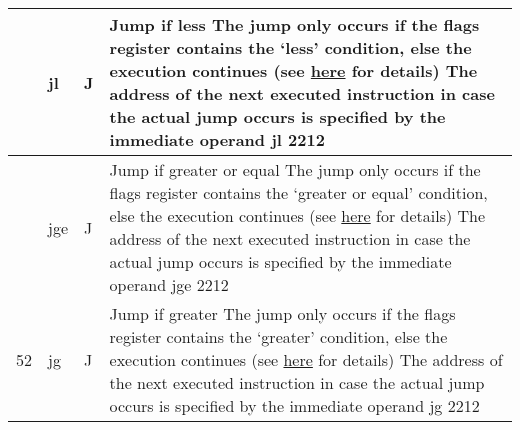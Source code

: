 \documentclass{article}
\newcommand{\St}[1]{{\fontfamily{qcr}\selectfont #1}}
\newcommand{\Ss}[1]{{\fontfamily{cmss}\selectfont #1}}
\begin{document}
{\begin{table*}[h!]
\begin{tabular}{| >{\centering\arraybackslash} m{1cm} | >{\centering\arraybackslash} m{1.4cm} | >{\centering\arraybackslash} m{1.2cm} | m{11.6cm} |}
 \hline
 
 50 & \St{jl} & \Ss{J} &
 
 Jump if less \newline
 The jump only occurs if the \St{flags} register contains the \lq less\rq \newline
 condition, else the execution continues (see \hyperlink{flags:details}{here} for details) \newline
 The address of the next executed instruction in case the actual jump occurs \newline
 is specified by the immediate operand \newline
 \St{jl 2212} \\
 
 \hline
 
 51 & \St{jge} & \Ss{J} &
 
 Jump if greater or equal \newline
 The jump only occurs if the \St{flags} register contains the \lq greater or equal\rq \newline
 condition, else the execution continues (see \hyperlink{flags:details}{here} for details) \newline
 The address of the next executed instruction in case the actual jump occurs \newline
 is specified by the immediate operand \newline
 \St{jge 2212} \\
 
 \hline
 
 52 & \St{jg} & \Ss{J} &
 
 Jump if greater \newline
 The jump only occurs if the \St{flags} register contains the \lq greater\rq \newline
 condition, else the execution continues (see \hyperlink{flags:details}{here} for details) \newline
 The address of the next executed instruction in case the actual jump occurs \newline
 is specified by the immediate operand \newline
 \St{jg 2212} \\
 
 \hline

\end{tabular}
\end{table*}
}

\newpage
\end{document}
